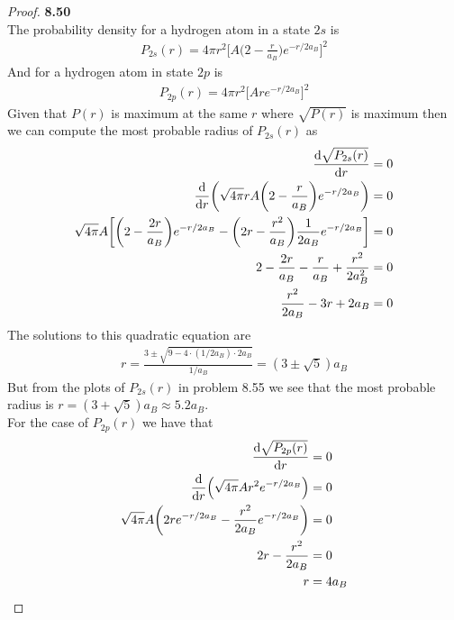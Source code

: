 \documentclass[11pt]{article}
\theoremstyle{definition}
\begin{document}
\cleardoublepage
\begin{proof}{\textbf{8.50}}\\
The probability density for a hydrogen atom in a state $2s$ is
\begin{align*}
    P_{2s}(r) = 4\pi r^2 \bigg[A\bigg(2 -\frac{r}{a_B}\bigg)e^{-r/2a_B}\bigg]^2
\end{align*}
And for a hydrogen atom in state $2p$ is
\begin{align*}
    P_{2p}(r) = 4\pi r^2 \bigg[Are^{-r/2a_B}\bigg]^2
\end{align*}
Given that $P(r)$ is maximum at the same $r$ where $\sqrt{P(r)}$ is maximum
then we can compute the most probable radius of $P_{2s}(r)$ as
\begin{align*}
    \dv{\sqrt{P_{2s}(r)}}{r} &= 0\\
    \dv{r}(\sqrt{4\pi}rA\bigg(2 -\frac{r}{a_B}\bigg)e^{-r/2a_B})
    &= 0\\
    \sqrt{4\pi}A\bigg[\bigg(2 -\frac{2r}{a_B}\bigg)e^{-r/2a_B} -
    \bigg(2r -\frac{r^2}{a_B}\bigg)\frac{1}{2a_B}e^{-r/2a_B}\bigg]
    &= 0\\
    2 -\frac{2r}{a_B} - \frac{r}{a_B} + \frac{r^2}{2a_B^2} &= 0\\
    \frac{r^2}{2a_B} - 3r + 2a_B &= 0
\end{align*}
The solutions to this quadratic equation are
\begin{align*}
    r = \frac{3 \pm \sqrt{9 - 4\cdot (1/2a_B) \cdot 2a_B}}{1/a_B}
    = (3 \pm \sqrt{5})a_B
\end{align*}
But from the plots of $P_{2s}(r)$ in problem 8.55 we see that the most
probable radius is $r = (3 + \sqrt{5})a_B \approx 5.2 a_B$.
\\
For the case of $P_{2p}(r)$ we have that
\begin{align*}
    \dv{\sqrt{P_{2p}(r)}}{r} &= 0\\
    \dv{r}(\sqrt{4\pi}Ar^2e^{-r/2a_B}) &= 0\\
    \sqrt{4\pi}A\bigg(2re^{-r/2a_B} - \frac{r^2}{2a_B}e^{-r/2a_B}\bigg) &= 0\\
    2r - \frac{r^2}{2a_B} &= 0\\
    r &= 4a_B
\end{align*}
\end{proof}
\end{document}

